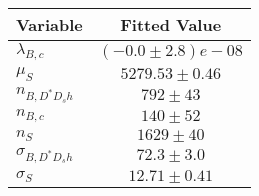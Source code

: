 \begin{tabular}[t]{lc}
\hline
Variable &Fitted Value\\
\hline\hline
$\lambda_{B,c}$&$(-0.0\pm2.8)e-08$\\
\hline
$\mu_S$&$5279.53\pm0.46$\\
\hline
$n_{B, D^* D_s h}$&$792\pm43$\\
\hline
$n_{B,c}$&$140\pm52$\\
\hline
$n_S$&$1629\pm40$\\
\hline
$\sigma_{B, D^* D_s h}$&$72.3\pm3.0$\\
\hline
$\sigma_S$&$12.71\pm0.41$\\
\hline
\end{tabular}